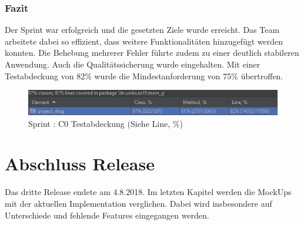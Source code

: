 \documentclass[12pt, titlepage]{scrartcl}
\newcommand{\RN}[1]{%
	\textup{\uppercase\expandafter{\romannumeral#1}}%
}
\begin{document}
	    	\subsubsection{Fazit}
	    		Der Sprint \RN{6} war erfolgreich und die gesetzten Ziele wurde erreicht. Das Team arbeitete dabei so effizient, dass weitere Funktionalit\"aten hinzugef\"ugt werden konnten. Die Behebung mehrerer Fehler f\"uhrte zudem zu einer deutlich stabileren Anwendung. Auch die Qualit\"atssicherung wurde eingehalten. Mit einer Testabdeckung von 82\% wurde die Mindestanforderung von 75\% \"ubertroffen.
	    		\begin{figure}[H] 
	    			\centering
	    			\includegraphics[width=\textwidth]{images/sprintVI/coverage.png}
	    			\caption{Sprint \RN{6}: C0 Testabdeckung (Siehe Line, \%)}
	    			\label{Coverage_6}
	    		\end{figure} 
	\newpage
	\section{Abschluss Release \RN{3}}
		Das dritte Release endete am 4.8.2018. Im letzten Kapitel werden die MockUps mit der aktuellen Implementation verglichen. Dabei wird insbesondere auf Unterschiede und fehlende Features eingegangen werden.
\end{document}
